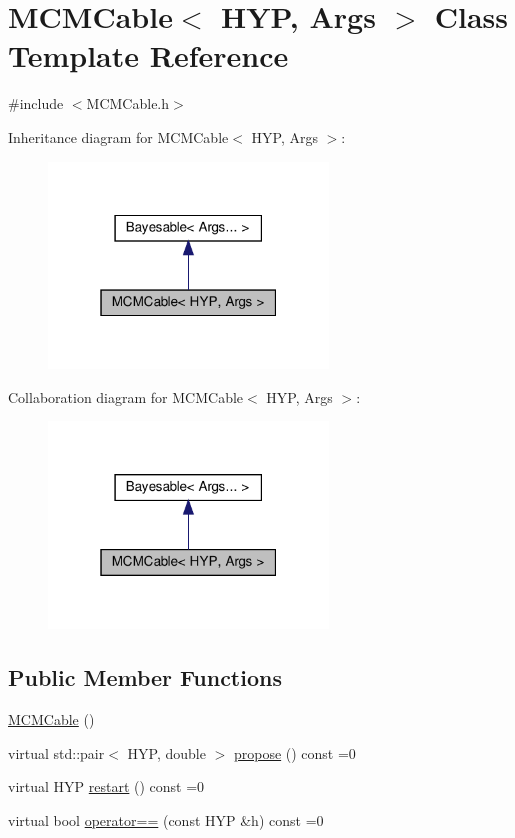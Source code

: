 \hypertarget{class_m_c_m_cable}{}\section{M\+C\+M\+Cable$<$ H\+YP, Args $>$ Class Template Reference}
\label{class_m_c_m_cable}


{\ttfamily \#include $<$M\+C\+M\+Cable.\+h$>$}



Inheritance diagram for M\+C\+M\+Cable$<$ H\+YP, Args $>$\+:\nopagebreak
\begin{figure}[H]
\begin{center}
\leavevmode
\includegraphics[width=211pt]{class_m_c_m_cable__inherit__graph}
\end{center}
\end{figure}


Collaboration diagram for M\+C\+M\+Cable$<$ H\+YP, Args $>$\+:\nopagebreak
\begin{figure}[H]
\begin{center}
\leavevmode
\includegraphics[width=211pt]{class_m_c_m_cable__coll__graph}
\end{center}
\end{figure}
\subsection*{Public Member Functions}
\begin{DoxyCompactItemize}
\item 
\hyperlink{class_m_c_m_cable_aac715433bffb674dd5809e7c1bc59ae5}{M\+C\+M\+Cable} ()
\item 
virtual std\+::pair$<$ H\+YP, double $>$ \hyperlink{class_m_c_m_cable_ab119a14256ab92c5c1e941f8492df830}{propose} () const =0
\item 
virtual H\+YP \hyperlink{class_m_c_m_cable_a220d6c4ca73e20441c14fa5bd3e090d3}{restart} () const =0
\item 
virtual bool \hyperlink{class_m_c_m_cable_aa73001ec3bb0cf0c618281dfa998f2f1}{operator==} (const H\+YP \&h) const =0
\end{DoxyCompactItemize}
